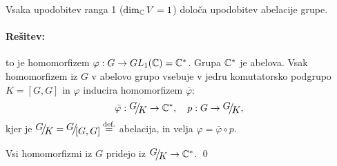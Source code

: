 \begin{zgled}
	Vsaka upodobitev ranga 1 ($\dim_{\mathbb{C}}V = 1$) dolo\v ca upodobitev abelacije grupe.

	\paragraph{Re\v sitev:} to je homomorfizem $\varphi : G \to GL_1 (\mathbb{C}) = \mathbb{C}^*$. Grupa $\mathbb{C}^*$ je abelova.
	Vsak homomorfizem iz $G$ v abelovo grupo vsebuje v jedru komutatorsko podgrupo $K = [G,G]$ in $\varphi$ inducira
	homomorfizem $\bar{\varphi}$:
	\[
		\bar{\varphi} : \quot{G}{K} \to \C^*, \quad p : G \to \quot{G}{K},
	\]
	kjer je $\quot{G}{K} = \quot{G}{[G,G]} \stackrel{\text{def.}}{=}$ abelacija, in velja $\varphi = \bar{\varphi} \circ p$.
	
	Vsi homomorfizmi iz $G$ pridejo iz $\quot{G}{K} \to \C^*$.
	\qed
\end{zgled}
